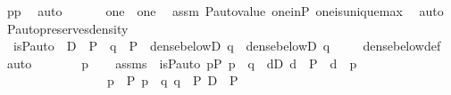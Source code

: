 \begin{isabellebody}
\ pp\ \isamarkupfalse%
\ auto\ \isanewline
\ \ \isamarkupfalse%
\ \isamarkupfalse%
\ {\isachardoublequoteopen}{\isasympi}{\isacharbackquote}{\kern0pt}one\ {\isacharequal}{\kern0pt}\ one{\isachardoublequoteclose}\ \isamarkupfalse%
\ assm\ P{\isacharunderscore}{\kern0pt}auto{\isacharunderscore}{\kern0pt}value\ one{\isacharunderscore}{\kern0pt}in{\isacharunderscore}{\kern0pt}P\ one{\isacharunderscore}{\kern0pt}is{\isacharunderscore}{\kern0pt}unique{\isacharunderscore}{\kern0pt}max\ \isamarkupfalse%
\ auto\isanewline
{}\isamarkupfalse%
%
\endisatagproof
{\isafoldproof}%
%
\isadelimproof
\isanewline
%
\endisadelimproof
\isanewline
{}\isamarkupfalse%
\ P{\isacharunderscore}{\kern0pt}auto{\isacharunderscore}{\kern0pt}preserves{\isacharunderscore}{\kern0pt}density\ {\isacharcolon}{\kern0pt}\ \isanewline
\ \ {\isachardoublequoteopen}is{\isacharunderscore}{\kern0pt}P{\isacharunderscore}{\kern0pt}auto{\isacharparenleft}{\kern0pt}{\isasympi}{\isacharparenright}{\kern0pt}\ {\isasymLongrightarrow}\ D\ {\isasymsubseteq}\ P\ {\isasymLongrightarrow}\ q\ {\isasymin}\ P\ {\isasymLongrightarrow}\ dense{\isacharunderscore}{\kern0pt}below{\isacharparenleft}{\kern0pt}D{\isacharcomma}{\kern0pt}\ q{\isacharparenright}{\kern0pt}\ {\isasymLongrightarrow}\ dense{\isacharunderscore}{\kern0pt}below{\isacharparenleft}{\kern0pt}{\isasympi}{\isacharbackquote}{\kern0pt}{\isacharbackquote}{\kern0pt}D{\isacharcomma}{\kern0pt}\ {\isasympi}{\isacharbackquote}{\kern0pt}q{\isacharparenright}{\kern0pt}{\isachardoublequoteclose}\ \isanewline
%
\isadelimproof
\ \ %
\endisadelimproof
%
\isatagproof
{}\isamarkupfalse%
\ dense{\isacharunderscore}{\kern0pt}below{\isacharunderscore}{\kern0pt}def\ \isamarkupfalse%
\ auto\ \isanewline
{}\isamarkupfalse%
\ {\isacharminus}{\kern0pt}\ \isanewline
\ \ \isamarkupfalse%
\ p\isanewline
\ \ \isamarkupfalse%
\ assms\ {\isacharcolon}{\kern0pt}\ {\isachardoublequoteopen}is{\isacharunderscore}{\kern0pt}P{\isacharunderscore}{\kern0pt}auto{\isacharparenleft}{\kern0pt}{\isasympi}{\isacharparenright}{\kern0pt}{\isachardoublequoteclose}\ {\isachardoublequoteopen}{\isasymforall}p{\isasymin}P{\isachardot}{\kern0pt}\ p\ {\isasympreceq}\ q\ {\isasymlongrightarrow}\ {\isacharparenleft}{\kern0pt}{\isasymexists}d{\isasymin}D{\isachardot}{\kern0pt}\ d\ {\isasymin}\ P\ {\isasymand}\ d\ {\isasympreceq}\ p{\isacharparenright}{\kern0pt}{\isachardoublequoteclose}\ \isanewline
\ \ \ \ \ \ \ \ \ \ \ \ \ \ \ \ \ {\isachardoublequoteopen}p\ {\isasymin}\ P{\isachardoublequoteclose}\ {\isachardoublequoteopen}p\ {\isasympreceq}\ {\isasympi}{\isacharbackquote}{\kern0pt}q{\isachardoublequoteclose}\ {\isachardoublequoteopen}q\ {\isasymin}\ P{\isachardoublequoteclose}\ {\isachardoublequoteopen}D\ {\isasymsubseteq}\ P{\isachardoublequoteclose}\ \isanewline

\end{isabellebody}
